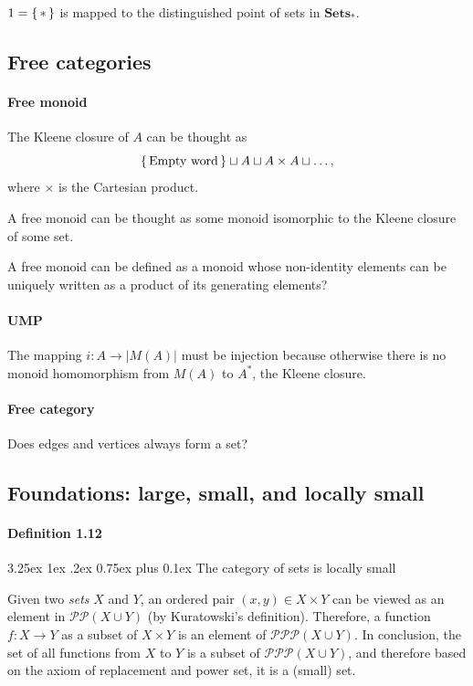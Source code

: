 \documentclass[12pt, letterpaper]{article}
\makeatletter
\renewcommand\subparagraph{\@startsection{subparagraph}{5}{\parindent}%
	{3.25ex \@plus1ex \@minus .2ex}%
	{0.75ex plus 0.1ex}%
	{\normalfont\normalsize\bfseries}}
\newcommand{\red}[1]{{\color{red} #1}}
\newcommand{\power}{\mathcal{P}}
\theoremstyle{definition}
\theoremstyle{remark}
\theoremstyle{definition}
\theoremstyle{plain}
\numberwithin{equation}{section}
\makeatother
\begin{document}
	$1=\set{*}$ is mapped to the distinguished point of sets in $\mathbf{Sets}_*$.
	
	\subsection{Free categories}
	\paragraph{Free monoid}
	The Kleene closure of $A$ can be thought as
	\[ \set{\text{Empty word}} \sqcup A \sqcup A\times A \sqcup \dots ,  \]
	where $\times $ is the Cartesian product.
	
	A free monoid can be thought as some monoid isomorphic to the  Kleene closure of some set.
	
	A free monoid can be defined as a monoid whose non-identity elements can be uniquely written as a product of its generating elements?
	
	\paragraph{UMP}
	
	The mapping $i\colon A\to |M(A)|$ must be injection because otherwise there is no monoid
	homomorphism from $M(A)$ to $A^*$, the Kleene closure.
	
	\paragraph{Free category}
	
	\red{Does edges and vertices always form a set?}
	
	\subsection{Foundations: large, small, and locally small}
	
	\paragraph{Definition 1.12}
	
	\subparagraph{The category of sets is locally small}
	
	Given two \textit{sets} $X$ and $Y$,
	an ordered pair $(x,y)\in X\times Y$ can be viewed as an element in $\power\power(X\cup Y)$
	(by Kuratowski's definition).
	Therefore, a function $f\colon X\to Y$ as a subset of $X\times Y$ is an element of $\power\power\power(X\cup Y)$.
	In conclusion, the set of all functions from $X$ to $Y$ is a subset of $\power\power\power(X\cup Y)$,
	and therefore based on the axiom of replacement and power set, it is a (small) set.
	
\end{document}

